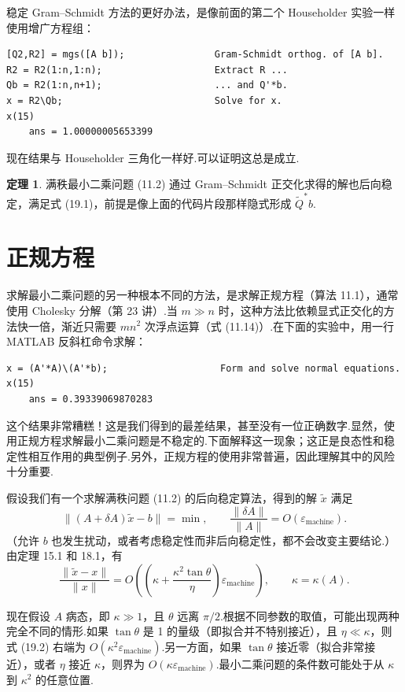 \documentclass[UTF8,fontset=none,12pt]{ctexart}
\newcommand{\epsmach}{\varepsilon_{\mathrm{machine}}}
\theoremstyle{definition}
\newtheorem{theorem}{定理}
\begin{document}
稳定 Gram--Schmidt 方法的更好办法，是像前面的第二个 Householder 实验一样使用增广方程组：

\begin{verbatim}
[Q2,R2] = mgs([A b]);                Gram-Schmidt orthog. of [A b].
R2 = R2(1:n,1:n);                    Extract R ...
Qb = R2(1:n,n+1);                    ... and Q'*b.
x = R2\Qb;                           Solve for x.
x(15)
    ans = 1.00000005653399
\end{verbatim}

现在结果与 Householder 三角化一样好.可以证明这总是成立.

\begin{theorem}
满秩最小二乘问题 (11.2) 通过 Gram--Schmidt 正交化求得的解也后向稳定，满足式 (19.1)，前提是像上面的代码片段那样隐式形成 $\widetilde Q^*b$.
\end{theorem}

\section*{正规方程}

求解最小二乘问题的另一种根本不同的方法，是求解正规方程（算法 11.1），通常使用 Cholesky 分解（第 23 讲）.当 $m\gg n$ 时，这种方法比依赖显式正交化的方法快一倍，渐近只需要 $mn^2$ 次浮点运算（式 (11.14)）.在下面的实验中，用一行 MATLAB 反斜杠命令求解：

\begin{verbatim}
x = (A'*A)\(A'*b);                    Form and solve normal equations.
x(15)
    ans = 0.39339069870283
\end{verbatim}

这个结果非常糟糕！这是我们得到的最差结果，甚至没有一位正确数字.显然，使用正规方程求解最小二乘问题是不稳定的.下面解释这一现象；这正是良态性和稳定性相互作用的典型例子.另外，正规方程的使用非常普遍，因此理解其中的风险十分重要.

假设我们有一个求解满秩问题 (11.2) 的后向稳定算法，得到的解 $\widetilde x$ 满足
\[
\|(A+\delta A)\widetilde x-b\|=\min,
\qquad \frac{\|\delta A\|}{\|A\|}=O(\epsmach).
\]
（允许 $b$ 也发生扰动，或者考虑稳定性而非后向稳定性，都不会改变主要结论.）由定理 15.1 和 18.1，有
\begin{equation}
    \frac{\|\widetilde x-x\|}{\|x\|}
    =O\left(\left(\kappa+\frac{\kappa^2\tan\theta}{\eta}\right)\epsmach\right),
    \qquad \kappa=\kappa(A).
    \tag{19.2}
\end{equation}

现在假设 $A$ 病态，即 $\kappa\gg1$，且 $\theta$ 远离 $\pi/2$.根据不同参数的取值，可能出现两种完全不同的情形.如果 $\tan\theta$ 是 1 的量级（即拟合并不特别接近），且 $\eta\ll\kappa$，则式 (19.2) 右端为 $O(\kappa^2\epsmach)$.另一方面，如果 $\tan\theta$ 接近零（拟合非常接近），或者 $\eta$ 接近 $\kappa$，则界为 $O(\kappa\epsmach)$.最小二乘问题的条件数可能处于从 $\kappa$ 到 $\kappa^2$ 的任意位置.
\end{document}
